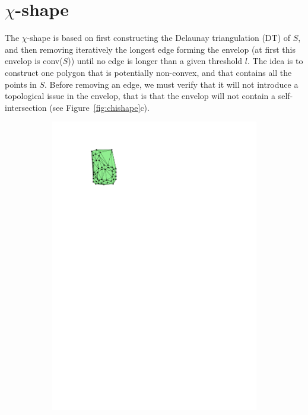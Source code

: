 %
\section{$\chi$-shape}

The $\chi$-shape is based on first constructing the Delaunay triangulation (DT) of $S$, and then removing iteratively the longest edge forming the envelop (at first this envelop is conv($S$)) until no edge is longer than a given threshold $l$.
The idea is to construct one polygon that is potentially non-convex, and that contains all the points in $S$.
Before removing an edge, we must verify that it will not introduce a topological issue in the envelop, that is that the envelop will not contain a self-intersection (see Figure~\ref{fig:chishape}c).
\begin{figure}
  \centering
  \begin{subfigure}[b]{0.25\linewidth}
    \centering
    \includegraphics[page=1,width=\textwidth]{figs/chishape.pdf}

\end{subfigure}
\end{figure}
